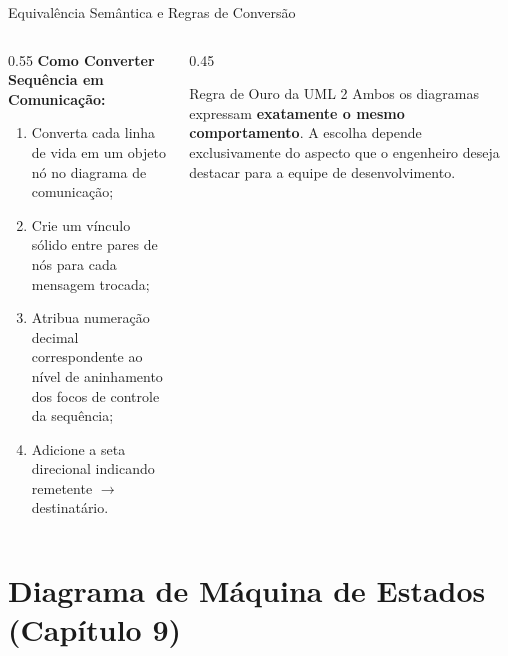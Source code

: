 \documentclass[10pt]{beamer}
\begin{document}
\begin{frame}{Equivalência Semântica e Regras de Conversão}
    \begin{columns}
        \begin{column}{0.55\textwidth}
            \textbf{Como Converter Sequência em Comunicação:}
            \begin{enumerate}
                \item Converta cada linha de vida em um objeto nó no diagrama de comunicação;
                \item Crie um vínculo sólido entre pares de nós para cada mensagem trocada;
                \item Atribua numeração decimal correspondente ao nível de aninhamento dos focos de controle da sequência;
                \item Adicione a seta direcional indicando remetente $\rightarrow$ destinatário.
            \end{enumerate}
        \end{column}
        \begin{column}{0.45\textwidth}
            \begin{block}{Regra de Ouro da UML 2}
                Ambos os diagramas expressam \textbf{exatamente o mesmo comportamento}. A escolha depende exclusivamente do aspecto que o engenheiro deseja destacar para a equipe de desenvolvimento.
            \end{block}
        \end{column}
    \end{columns}
\end{frame}

\section{Diagrama de Máquina de Estados (Capítulo 9)}
\end{document}
